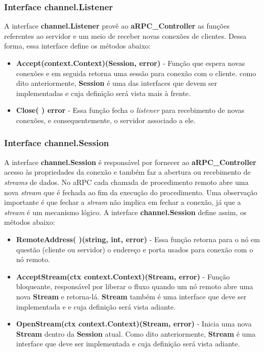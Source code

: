 \subsubsection{Interface channel.Listener}

A interface \textbf{channel.Listener} provê ao \textbf{aRPC\_Controller} as funções referentes ao servidor e um meio de receber novas conexões de clientes. Dessa forma, essa interface define os métodos abaixo:

\begin{itemize}
	\item \textbf{Accept(context.Context)(Session, error)} - Função que espera novas conexões e em seguida retorna uma sessão para conexão com o cliente. como dito anteriormente, \textbf{Session} é uma das interfaces que devem ser implementadas e cuja definição será vista mais à frente.
	\item \textbf{Close( ) error} - Essa função fecha o \textit{listener} para recebimento de novas conexões, e consequentemente, o servidor associado a ele.
\end{itemize}

\subsubsection{Interface channel.Session}

A interface \textbf{channel.Session} é responsável por fornecer ao \textbf{aRPC\_Controller} acesso às propriedades da conexão e também faz a abertura ou recebimento de \textit{streams} de dados. No aRPC cada chamada de procedimento remoto abre uma nova \textit{stream} que  é fechada ao fim da execução do procedimento. Uma observação importante é que fechar a \textit{stream} não implica em fechar a conexão, já que a \textit{stream} é um mecanismo lógico. A interface \textbf{channel.Session} define assim, os métodos abaixo:

\begin{itemize}
	\item \textbf{RemoteAddress( )(string, int, error)} - Essa função retorna para o nó em questão (cliente ou servidor) o endereço e porta usados para conexão com o nó remoto.
	\item \textbf{AcceptStream(ctx context.Context)(Stream, error)} - Função bloqueante, responsável por liberar o fluxo quando um nó remoto abre uma nova \textbf{Stream} e retorna-lá. \textbf{Stream} também é uma interface que deve ser implementada e e cuja definição será vista adiante.
	\item \textbf{OpenStream(ctx context.Context)(Stream, error)} - Inicia uma nova \textbf{Stream} dentro da \textbf{Session} atual. Como dito anteriormente, \textbf{Stream} é uma interface que deve ser implementada e cuja definição será vista adiante.
\end{itemize}


